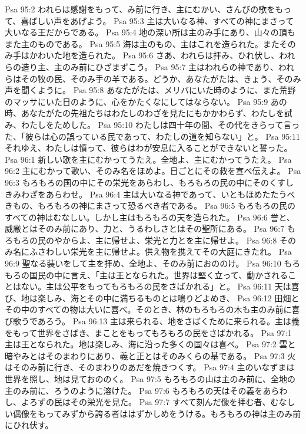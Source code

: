 Psa 95:2  われらは感謝をもって、み前に行き、主にむかい、さんびの歌をもって、喜ばしい声をあげよう。
Psa 95:3  主は大いなる神、すべての神にまさって大いなる王だからである。
Psa 95:4  地の深い所は主のみ手にあり、山々の頂もまた主のものである。
Psa 95:5  海は主のもの、主はこれを造られた。またそのみ手はかわいた地を造られた。
Psa 95:6  さあ、われらは拝み、ひれ伏し、われらの造り主、主のみ前にひざまずこう。
Psa 95:7  主はわれらの神であり、われらはその牧の民、そのみ手の羊である。どうか、あなたがたは、きょう、そのみ声を聞くように。
Psa 95:8  あなたがたは、メリバにいた時のように、また荒野のマッサにいた日のように、心をかたくなにしてはならない。
Psa 95:9  あの時、あなたがたの先祖たちはわたしのわざを見たにもかかわらず、わたしを試み、わたしをためした。
Psa 95:10  わたしは四十年の間、その代をきらって言った、「彼らは心の誤っている民であって、わたしの道を知らない」と。
Psa 95:11  それゆえ、わたしは憤って、彼らはわが安息に入ることができないと誓った。
Psa 96:1  新しい歌を主にむかってうたえ。全地よ、主にむかってうたえ。
Psa 96:2  主にむかって歌い、そのみ名をほめよ。日ごとにその救を宣べ伝えよ。
Psa 96:3  もろもろの国の中にその栄光をあらわし、もろもろの民の中にそのくすしきみわざをあらわせ。
Psa 96:4  主は大いなる神であって、いともほめたたうべきもの、もろもろの神にまさって恐るべき者である。
Psa 96:5  もろもろの民のすべての神はむなしい。しかし主はもろもろの天を造られた。
Psa 96:6  誉と、威厳とはそのみ前にあり、力と、うるわしさとはその聖所にある。
Psa 96:7  もろもろの民のやからよ、主に帰せよ、栄光と力とを主に帰せよ。
Psa 96:8  そのみ名にふさわしい栄光を主に帰せよ。供え物を携えてその大庭にきたれ。
Psa 96:9  聖なる装いをして主を拝め、全地よ、そのみ前におののけ。
Psa 96:10  もろもろの国民の中に言え、「主は王となられた。世界は堅く立って、動かされることはない。主は公平をもってもろもろの民をさばかれる」と。
Psa 96:11  天は喜び、地は楽しみ、海とその中に満ちるものとは鳴りどよめき、
Psa 96:12  田畑とその中のすべての物は大いに喜べ。そのとき、林のもろもろの木も主のみ前に喜び歌うであろう。
Psa 96:13  主は来られる、地をさばくために来られる。主は義をもって世界をさばき、まことをもってもろもろの民をさばかれる。
Psa 97:1  主は王となられた。地は楽しみ、海に沿った多くの国々は喜べ。
Psa 97:2  雲と暗やみとはそのまわりにあり、義と正とはそのみくらの基である。
Psa 97:3  火はそのみ前に行き、そのまわりのあだを焼きつくす。
Psa 97:4  主のいなずまは世界を照し、地は見ておののく。
Psa 97:5  もろもろの山は主のみ前に、全地の主のみ前に、ろうのように溶けた。
Psa 97:6  もろもろの天はその義をあらわし、よろずの民はその栄光を見た。
Psa 97:7  すべて刻んだ像を拝む者、むなしい偶像をもってみずから誇る者ははずかしめをうける。もろもろの神は主のみ前にひれ伏す。
